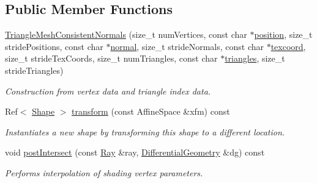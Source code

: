 \subsection*{Public Member Functions}
\begin{DoxyCompactItemize}
\item 
\hyperlink{classembree_1_1_triangle_mesh_consistent_normals_af8de1cf592d99cc4bde7f8d2af809e87}{TriangleMeshConsistentNormals} (size\_\-t numVertices, const char $\ast$\hyperlink{classembree_1_1_triangle_mesh_consistent_normals_ac123e3f2933e7ba9983a46e35da96e3c}{position}, size\_\-t stridePositions, const char $\ast$\hyperlink{classembree_1_1_triangle_mesh_consistent_normals_a847dd1f07b178d54ee7da385d0d58f6f}{normal}, size\_\-t strideNormals, const char $\ast$\hyperlink{classembree_1_1_triangle_mesh_consistent_normals_aea3e6097dde4ed0fbd5e4050dc61d5c1}{texcoord}, size\_\-t strideTexCoords, size\_\-t numTriangles, const char $\ast$\hyperlink{classembree_1_1_triangle_mesh_consistent_normals_aa707ca2ad499a3073debfc02ef1bf6c6}{triangles}, size\_\-t strideTriangles)
\begin{DoxyCompactList}\small\item\em Construction from vertex data and triangle index data. \item\end{DoxyCompactList}\item 
Ref$<$ \hyperlink{classembree_1_1_shape}{Shape} $>$ \hyperlink{classembree_1_1_triangle_mesh_consistent_normals_a37a0a6d70ee5386cb297fc01465324b5}{transform} (const AffineSpace \&xfm) const 
\begin{DoxyCompactList}\small\item\em Instantiates a new shape by transforming this shape to a different location. \item\end{DoxyCompactList}\item 
void \hyperlink{classembree_1_1_triangle_mesh_consistent_normals_a86e8123b83f40ff259f12bba8662d557}{postIntersect} (const \hyperlink{structembree_1_1_ray}{Ray} \&ray, \hyperlink{structembree_1_1_differential_geometry}{DifferentialGeometry} \&dg) const 
\begin{DoxyCompactList}\small\item\em Performs interpolation of shading vertex parameters. \item\end{DoxyCompactList}\end{DoxyCompactItemize}
